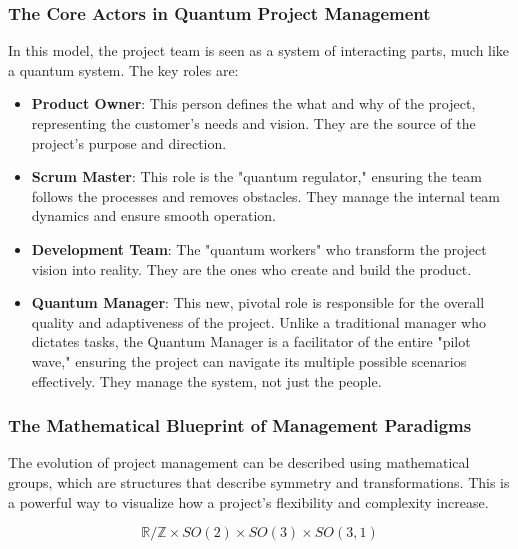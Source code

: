 \documentclass{article}
\begin{document}
\subsubsection*{The Core Actors in Quantum Project Management}
In this model, the project team is seen as a system of interacting parts, much like a quantum system. The key roles are:
\begin{itemize}
\item \textbf{Product Owner}: This person defines the what and why of the project, representing the customer's needs and vision. They are the source of the project's purpose and direction.
\item \textbf{Scrum Master}: This role is the "quantum regulator," ensuring the team follows the processes and removes obstacles. They manage the internal team dynamics and ensure smooth operation.
\item \textbf{Development Team}: The "quantum workers" who transform the project vision into reality. They are the ones who create and build the product.
\item \textbf{Quantum Manager}: This new, pivotal role is responsible for the overall quality and adaptiveness of the project. Unlike a traditional manager who dictates tasks, the Quantum Manager is a facilitator of the entire "pilot wave," ensuring the project can navigate its multiple possible scenarios effectively. They manage the system, not just the people.
\end{itemize}

\subsubsection*{The Mathematical Blueprint of Management Paradigms}
The evolution of project management can be described using mathematical groups, which are structures that describe symmetry and transformations. This is a powerful way to visualize how a project's flexibility and complexity increase.

\begin{equation}
\mathbb{R/Z} \times SO(2) \times SO(3) \times SO(3, 1) 
\end{equation}
\end{document}
